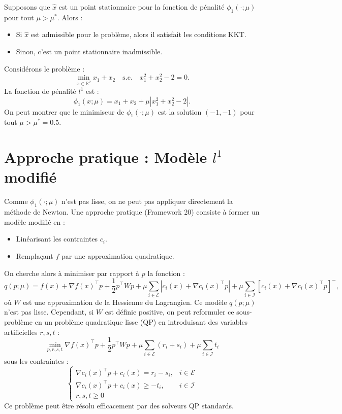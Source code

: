 \begin{theoreme}
    Supposons que $\hat{x}$ est un point stationnaire pour la fonction de pénalité $\phi_1(\cdot; \mu)$ pour tout $\mu > \mu^*$.
    Alors :
    \begin{itemize}
        \item Si $\hat{x}$ est admissible pour le problème, alors il satisfait les conditions KKT.
        \item Sinon, c'est un point stationnaire inadmissible.
    \end{itemize}
\end{theoreme}

\begin{exemple}
    Considérons le problème :
    \[
        \min_{x \in \mathbb{R}^2} x_1 + x_2 \quad \text{s.c.} \quad x_1^2 + x_2^2 - 2 = 0.
    \]
    La fonction de pénalité $l^1$ est :
    \[
        \phi_1(x; \mu) = x_1 + x_2 + \mu |x_1^2 + x_2^2 - 2|.
    \]
    On peut montrer que le minimiseur de $\phi_1(\cdot; \mu)$ est la solution $(-1, -1)$ pour tout $\mu > \mu^* = 0.5$.
\end{exemple}

\section{Approche pratique : Modèle $l^1$ modifié}

Comme $\phi_1(\cdot; \mu)$ n'est pas lisse, on ne peut pas appliquer directement la méthode de Newton.
Une approche pratique (Framework 20) consiste à former un modèle modifié en :
\begin{itemize}
    \item Linéarisant les contraintes $c_i$.
    \item Remplaçant $f$ par une approximation quadratique.
\end{itemize}
On cherche alors à minimiser par rapport à $p$ la fonction :
\[
    q(p; \mu) = f(x) + \nabla f(x)^\top p + \frac{1}{2} p^\top W p + \mu \sum_{i \in \mathcal{E}} |c_i(x) + \nabla c_i(x)^\top p| + \mu \sum_{i \in \mathcal{I}} [c_i(x) + \nabla c_i(x)^\top p]^-,
\]
où $W$ est une approximation de la Hessienne du Lagrangien.
Ce modèle $q(p; \mu)$ n'est pas lisse. Cependant, si $W$ est définie positive, on peut reformuler ce sous-problème en un problème quadratique lisse (QP) en introduisant des variables artificielles $r, s, t$ :
\[
    \min_{p, r, s, t} \nabla f(x)^\top p + \frac{1}{2} p^\top W p + \mu \sum_{i \in \mathcal{E}} (r_i + s_i) + \mu \sum_{i \in \mathcal{I}} t_i
\]
sous les contraintes :
\[
    \begin{cases}
        \nabla c_i(x)^\top p + c_i(x) = r_i - s_i, & i \in \mathcal{E} \\
        \nabla c_i(x)^\top p + c_i(x) \ge -t_i, & i \in \mathcal{I} \\
        r, s, t \ge 0
    \end{cases}
\]
Ce problème peut être résolu efficacement par des solveurs QP standards.

